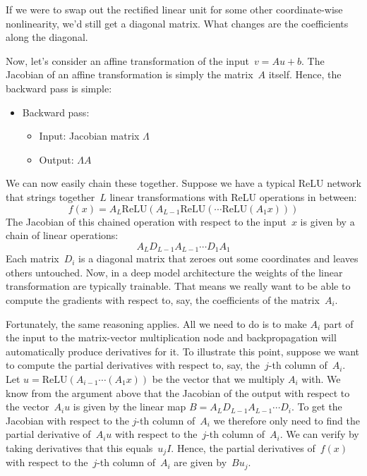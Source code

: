 \documentclass{tufte-book}
\begin{document}
If we were to swap out the rectified linear unit for some other
coordinate-wise nonlinearity, we'd still get a diagonal matrix. What
changes are the coefficients along the diagonal.

Now, let's consider an affine transformation of the input~\(v=Au + b\).
The Jacobian of an affine transformation is simply the matrix~\(A\)
itself. Hence, the backward pass is simple:

\begin{itemize}
\tightlist
\item
  Backward pass:

  \begin{itemize}
  \tightlist
  \item
    Input: Jacobian matrix \(\Lambda\)
  \item
    Output: \(\Lambda A\)
  \end{itemize}
\end{itemize}

We can now easily chain these together. Suppose we have a typical ReLU
network that strings together~\(L\) linear transformations with ReLU
operations in between: \[
f(x)=A_L\mathrm{ReLU}(A_{L-1}\mathrm{ReLU}(\cdots \mathrm{ReLU}(A_1x)))
\] The Jacobian of this chained operation with respect to the
input~\(x\) is given by a chain of linear operations: \[
A_LD_{L-1}A_{L-1}\cdots D_1A_1
\] Each matrix~\(D_i\) is a diagonal matrix that zeroes out some
coordinates and leaves others untouched. Now, in a deep model
architecture the weights of the linear transformation are typically
trainable. That means we really want to be able to compute the gradients
with respect to, say, the coefficients of the matrix~\(A_i\).

Fortunately, the same reasoning applies. All we need to do is to make
\(A_i\) part of the input to the matrix-vector multiplication node and
backpropagation will automatically produce derivatives for it. To
illustrate this point, suppose we want to compute the partial
derivatives with respect to, say, the~\(j\)-th column of~\(A_i\). Let
\(u=\mathrm{ReLU}(A_{i-1}\cdots (A_1x))\) be the vector that we multiply
\(A_i\) with. We know from the argument above that the Jacobian of the
output with respect to the vector~\(A_iu\) is given by the linear map
\(B=A_LD_{L-1}A_{L-1}\cdots D_i\). To get the Jacobian with respect to
the \(j\)-th column of~\(A_i\) we therefore only need to find the
partial derivative of~\(A_iu\) with respect to the~\(j\)-th column
of~\(A_i\). We can verify by taking derivatives that this
equals~\(u_jI\). Hence, the partial derivatives of~\(f(x)\) with respect
to the~\(j\)-th column of~\(A_i\) are given by~\(Bu_j\).
\end{document}
